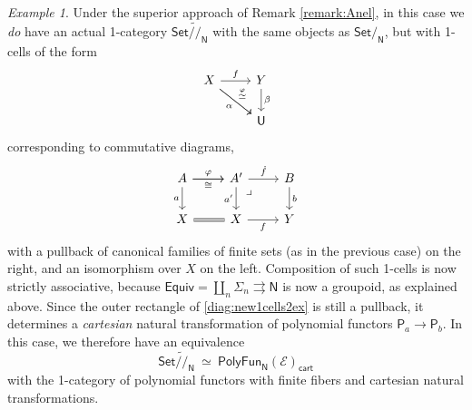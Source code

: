 \documentclass[12pt,reqno]{amsart}
\newcommand{\N}{\ensuremath{\mathbb{N}}}
\newcommand{\EE}{\ensuremath{\mathcal{E}}}
\newcommand{\Set}{\ensuremath{\mathsf{Set}}}
\newcommand{\alg}[1]{\ensuremath{\mathsf{#1}}}
\newcommand{\mono}{\ensuremath{\rightarrowtail}}
\renewcommand{\to}{\ensuremath{\rightarrow}}
\newcommand{\tto}{\ensuremath{\rightrightarrows}}
\newcommand{\T}{\ensuremath{\mathsf{U}}}
\renewcommand{\N}{\ensuremath{\mathsf{N}}}
\newcommand{\pbcorner}{\arrow[dr,phantom,"\lrcorner" very near start, shift right=.5ex]} %
\theoremstyle{remark}
\newtheorem{example}[theorem]{Example}
\theoremstyle{definition}
\begin{document}
\begin{example}
Under the superior approach of Remark \ref{remark:Anel}, in this case we \emph{do} have an actual 1-category $\Set\widetilde{/\!/}_\N$ with the same objects as $\Set/_\N$, but with 1-cells of the form 
\begin{equation}\label{diag:new1cells3ex}
\begin{tikzcd}
X \ar[r,swap,swap, "{f}"] \ar[rd,swap, "\alpha"] \ar[dr, "{\stackrel{\varphi}{\simeq}}"]&  Y \ar[d, "\beta"] \\
& \T
\end{tikzcd}
\end{equation}
corresponding to commutative diagrams,
\begin{equation}\label{diag:new1cells2ex}
\begin{tikzcd}
 A \ar[r, "{\varphi}"] \ar[r,swap, "{\cong}"] \ar[d,swap, "a"] & A' \ar[d, swap, "a'"]  \ar[r, "{\dot{f}}"]   \pbcorner & B \ar[d, "b"] \\  
 X \ar[r, equals] & X \ar[r,swap, "{f}"] &  Y
 \end{tikzcd}
 \end{equation}
with a pullback of canonical families of finite sets (as in the previous case) on the right, and an isomorphism over $X$ on the left.  Composition of such 1-cells is now strictly associative, because $\mathsf{Equiv} = \coprod_n\Sigma_n\tto \N$ is now a groupoid, as explained above.  Since the outer rectangle of \eqref{diag:new1cells2ex} is still a pullback, it determines a \emph{cartesian} natural transformation of polynomial functors $\alg{P}_a \to \alg{P}_b$. 
In this case, we therefore have an equivalence
\[
\Set\widetilde{/\!/}_\N\ \simeq\ \mathsf{PolyFun}_\N(\EE)_{\mathsf{cart}}
\]
with the 1-category of polynomial functors with finite fibers and cartesian natural transformations.  
%
%
%
%
%
\end{example}
 
%
%
%
\end{document}
